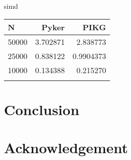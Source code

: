 \documentclass[ams]{article}
\begin{document}
simd
\begin{tabular}{|l|r|r|} \hline
  N & Pyker & PIKG \\ \hline
  50000 & 3.702871  & 2.838773\\
  25000 & 0.838122 & 0.9904373 \\
  10000 & 0.134388 & 0.215270 \\

 \\ \hline
\end{tabular}



\section{Conclusion}
\section{Acknowledgement}


\begin{thebibliography}{99}
\end{thebibliography}

\end{document}
